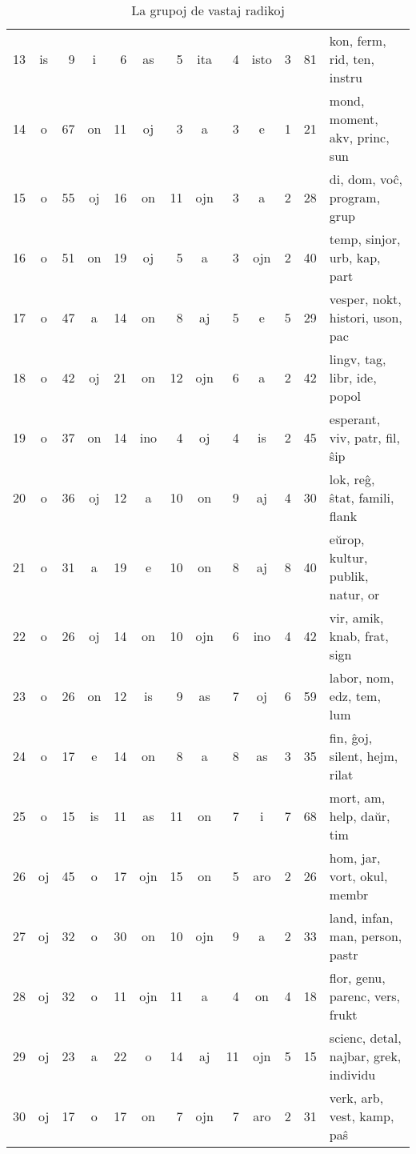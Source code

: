 \documentclass[12pt,twoside]{article}
\begin{document}
\begin{table}[h!]
\begin{center}
\begin{tabular}{ |l||c|r||c|r||c|r||c|r||c|r||r|l| }
13    &is    &9   &i    &6   &as    &5   &ita    &4  &isto    &3   &81 &           kon, ferm, rid, ten, instru \\
14     &o   &67  &on   &11   &oj    &3     &a    &3     &e    &1   &21 &         mond, moment, akv, princ, sun \\
15     &o   &55  &oj   &16   &on   &11   &ojn    &3     &a    &2   &28 &           di, dom, voĉ, program, grup \\
16     &o   &51  &on   &19   &oj    &5     &a    &3   &ojn    &2   &40 &          temp, sinjor, urb, kap, part \\
17     &o   &47   &a   &14   &on    &8    &aj    &5     &e    &5   &29 &      vesper, nokt, histori, uson, pac \\
18     &o   &42  &oj   &21   &on   &12   &ojn    &6     &a    &2   &42 &          lingv, tag, libr, ide, popol \\
19     &o   &37  &on   &14  &ino    &4    &oj    &4    &is    &2   &45 &         esperant, viv, patr, fil, ŝip \\
20     &o   &36  &oj   &12    &a   &10    &on    &9    &aj    &4   &30 &         lok, reĝ, ŝtat, famili, flank \\
21     &o   &31   &a   &19    &e   &10    &on    &8    &aj    &8   &40 &      eŭrop, kultur, publik, natur, or \\
22     &o   &26  &oj   &14   &on   &10   &ojn    &6   &ino    &4   &42 &           vir, amik, knab, frat, sign \\
23     &o   &26  &on   &12   &is    &9    &as    &7    &oj    &6   &59 &             labor, nom, edz, tem, lum \\
24     &o   &17   &e   &14   &on    &8     &a    &8    &as    &3   &35 &         fin, ĝoj, silent, hejm, rilat \\
25     &o   &15  &is   &11   &as   &11    &on    &7     &i    &7   &68 &             mort, am, help, daŭr, tim \\
26    &oj   &45   &o   &17  &ojn   &15    &on    &5   &aro    &2   &26 &           hom, jar, vort, okul, membr \\
27    &oj   &32   &o   &30   &on   &10   &ojn    &9     &a    &2   &33 &       land, infan, man, person, pastr \\
28    &oj   &32   &o   &11  &ojn   &11     &a    &4    &on    &4   &18 &       flor, genu, parenc, vers, frukt \\
29    &oj   &23   &a   &22    &o   &14    &aj   &11   &ojn    &5   &15 & scienc, detal, najbar, grek, individu \\
30    &oj   &17   &o   &17   &on    &7   &ojn    &7   &aro    &2   &31 &            verk, arb, vest, kamp, paŝ \\
\hline
\end{tabular}
\caption{La grupoj de vastaj radikoj}\label{table:vastaj}
\end{center}
\end{table}
\vspace{.2 in}
\end{document}
